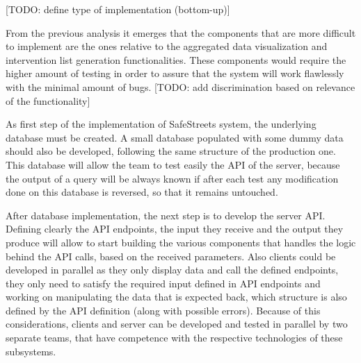 [TODO: define type of implementation (bottom-up)]

From the previous analysis it emerges that the components that are more difficult to implement are the ones relative to the aggregated data visualization and intervention list generation functionalities. These components would require the higher amount of testing in order to assure that the system will work flawlessly with the minimal amount of bugs. [TODO: add discrimination based on relevance of the functionality]

As first step of the implementation of SafeStreets system, the underlying database must be created. A small database populated with some dummy data should also be developed, following the same structure of the production one. This database will allow the team to test easily the API of the server, because the output of a query will be always known if after each test any modification done on this database is reversed, so that it remains untouched.

After database implementation, the next step is to develop the server API. Defining clearly the API endpoints, the input they receive and the output they produce will allow to start building the various components that handles the logic behind the API calls, based on the received parameters. Also clients could be developed in parallel as they only display data and call the defined endpoints, they only need to satisfy the required input defined in API endpoints and working on manipulating the data that is expected back, which structure is also defined by the API definition (along with possible errors). Because of this considerations, clients and server can be developed and tested in parallel by two separate teams, that have competence with the respective technologies of these subsystems.

